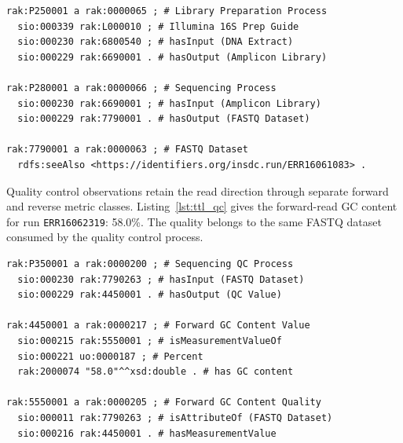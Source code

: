 \begin{revision}
\begin{lstlisting}[caption={Turtle representation of the sequencing workflow from soil sample T1Dr1 to ENA run ERR16061083.}, label={lst:ttl_sequencing}, basicstyle=\ttfamily\scriptsize, frame=single]
rak:P250001 a rak:0000065 ; # Library Preparation Process
  sio:000339 rak:L000010 ; # Illumina 16S Prep Guide
  sio:000230 rak:6800540 ; # hasInput (DNA Extract)
  sio:000229 rak:6690001 . # hasOutput (Amplicon Library)

rak:P280001 a rak:0000066 ; # Sequencing Process
  sio:000230 rak:6690001 ; # hasInput (Amplicon Library)
  sio:000229 rak:7790001 . # hasOutput (FASTQ Dataset)

rak:7790001 a rak:0000063 ; # FASTQ Dataset
  rdfs:seeAlso <https://identifiers.org/insdc.run/ERR16061083> .
\end{lstlisting}

Quality control observations retain the read direction through separate
forward and reverse metric classes. Listing~\ref{lst:ttl_qc} gives the
forward-read GC content for run \texttt{ERR16062319}: 58.0\%.
The quality belongs to the same FASTQ dataset consumed by the
quality control process.

\begin{lstlisting}[caption={Turtle representation of forward-read GC content for ENA run ERR16062319.}, label={lst:ttl_qc}, basicstyle=\ttfamily\scriptsize, frame=single]
rak:P350001 a rak:0000200 ; # Sequencing QC Process
  sio:000230 rak:7790263 ; # hasInput (FASTQ Dataset)
  sio:000229 rak:4450001 . # hasOutput (QC Value)

rak:4450001 a rak:0000217 ; # Forward GC Content Value
  sio:000215 rak:5550001 ; # isMeasurementValueOf
  sio:000221 uo:0000187 ; # Percent
  rak:2000074 "58.0"^^xsd:double . # has GC content

rak:5550001 a rak:0000205 ; # Forward GC Content Quality
  sio:000011 rak:7790263 ; # isAttributeOf (FASTQ Dataset)
  sio:000216 rak:4450001 . # hasMeasurementValue
\end{lstlisting}
\end{revision}
